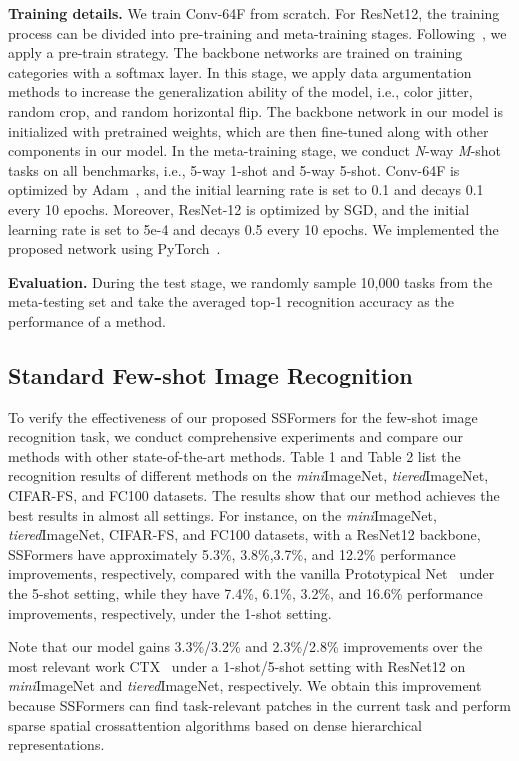 \documentclass{SCIS2019}
\begin{document}
\textbf{Training details.} We train Conv-64F from scratch. For ResNet12, the training process can be divided into pre-training and meta-training stages. Following~\cite{13}, we apply a pre-train strategy. The backbone networks are trained on training categories with a softmax layer. In this stage, we apply data argumentation methods to increase the generalization ability of the model, i.e., color jitter, random crop, and random horizontal flip.
The backbone network in our model is initialized with pretrained weights, which are then fine-tuned along with other components in our model. In the meta-training stage, we conduct \emph{N}-way \emph{M}-shot tasks on all benchmarks, i.e., 5-way 1-shot and 5-way 5-shot. Conv-64F is optimized by Adam~\cite{39}, and the initial learning rate is set to 0.1 and decays 0.1 every 10 epochs. Moreover, ResNet-12 is optimized by SGD, and the initial learning rate is set to 5e-4 and decays 0.5 every 10 epochs. We implemented the proposed network using PyTorch~\cite{38}.


\textbf{Evaluation.} During the test stage, we randomly sample 10,000 tasks from the meta-testing set and take the averaged top-1 recognition accuracy as the performance of a method.


\subsection{Standard Few-shot Image Recognition}
To verify the effectiveness of our proposed SSFormers for the few-shot image recognition task, we conduct comprehensive experiments and compare our methods with other state-of-the-art methods. Table 1 and Table 2 list the recognition results of different methods on the \emph{mini}ImageNet, \emph{tiered}ImageNet, CIFAR-FS, and FC100 datasets. The results show that our method achieves the best results in almost all settings. For instance, on the \emph{mini}ImageNet, \emph{tiered}ImageNet, CIFAR-FS, and FC100 datasets, with a ResNet12 backbone, SSFormers have approximately 5.3\%, 3.8\%,3.7\%, and 12.2\% performance improvements, respectively, compared with the vanilla Prototypical Net~\cite{7} under the 5-shot setting, while they have 7.4\%, 6.1\%, 3.2\%, and 16.6\% performance improvements, respectively, under the 1-shot setting.

Note that our model gains 3.3\%/3.2\% and 2.3\%/2.8\% improvements over the most relevant work CTX~\cite{21} under a 1-shot/5-shot setting with ResNet12 on \emph{mini}ImageNet and \emph{tiered}ImageNet, respectively. We obtain this improvement because SSFormers can find task-relevant patches in the current task and perform sparse spatial crossattention algorithms based on dense hierarchical representations.
\end{document}
